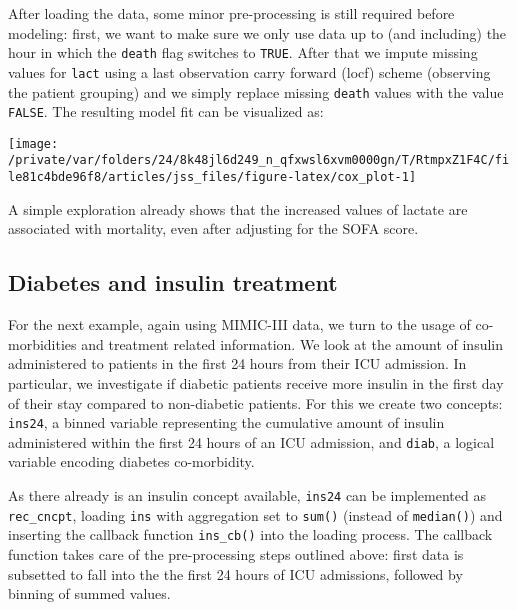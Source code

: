 \documentclass[
  notitle]{jss}
\begin{document}
After loading the data, some minor pre-processing is still required
before modeling: first, we want to make sure we only use data up to (and
including) the hour in which the \texttt{death} flag switches to
\texttt{TRUE}. After that we impute missing values for \texttt{lact}
using a last observation carry forward (locf) scheme (observing the
patient grouping) and we simply replace missing \texttt{death} values
with the value \texttt{FALSE}. The resulting model fit can be visualized
as:

\begin{CodeChunk}


\begin{center}\texttt{[image: /private/var/folders/24/8k48jl6d249\_n\_qfxwsl6xvm0000gn/T/RtmpxZ1F4C/file81c4bde96f8/articles/jss\_files/figure-latex/cox\_plot-1]} \end{center}

\end{CodeChunk}

A simple exploration already shows that the increased values of lactate
are associated with mortality, even after adjusting for the SOFA score.

\hypertarget{diabetes-and-insulin-treatment}{%
\subsection{Diabetes and insulin
treatment}\label{diabetes-and-insulin-treatment}}

For the next example, again using MIMIC-III data, we turn to the usage
of co-morbidities and treatment related information. We look at the
amount of insulin administered to patients in the first 24 hours from
their ICU admission. In particular, we investigate if diabetic patients
receive more insulin in the first day of their stay compared to
non-diabetic patients. For this we create two concepts: \texttt{ins24},
a binned variable representing the cumulative amount of insulin
administered within the first 24 hours of an ICU admission, and
\texttt{diab}, a logical variable encoding diabetes co-morbidity.

As there already is an insulin concept available, \texttt{ins24} can be
implemented as \texttt{rec\_cncpt}, loading \texttt{ins} with
aggregation set to \texttt{sum()} (instead of \texttt{median()}) and
inserting the callback function \texttt{ins\_cb()} into the loading
process. The callback function takes care of the pre-processing steps
outlined above: first data is subsetted to fall into the the first 24
hours of ICU admissions, followed by binning of summed values.
\end{document}
